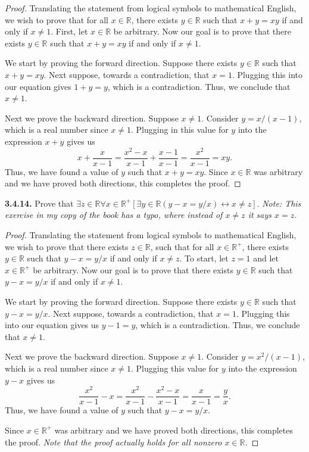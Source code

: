 \documentclass[12pt]{amsart}
\newenvironment{statement}[1]{\smallskip\noindent\color[rgb]{.6627, .3529, .6314} {\bf #1.}}{}
\theoremstyle{definition}
\theoremstyle{remark}
\newcommand{\BR}{\mathbb R}
\begin{document}
\begin{proof}
Translating the statement from logical symbols to mathematical English, we wish to prove that for all $x \in \BR$, there exists $y \in \BR$ such that $x + y = xy$ if and only if $x \neq 1$.
First, let $x \in \BR$ be arbitrary.
Now our goal is to prove that there exists $y \in \BR$ such that $x + y = xy$ if and only if $x \neq 1$.

We start by proving the forward direction.
Suppose there exists $y \in \BR$ such that $x + y = xy$. 
Next suppose, towards a contradiction, that $x = 1$.
Plugging this into our equation gives $1 + y = y$, which is a contradiction.
Thus, we conclude that $x \neq 1$.

Next we prove the backward direction.
Suppose $x \neq 1$.
Consider $y = x / (x - 1)$, which is a real number since $x \neq 1$.
Plugging in this value for $y$ into the expression $x + y$ gives us
\begin{equation*}
	x + \frac{x}{x - 1} = \frac{x^2 - x}{x - 1} + \frac{x - 1}{x - 1}
	= \frac{x^2}{x - 1} = xy.
\end{equation*}
Thus, we have found a value of $y$ such that $x + y = xy$.
Since $x \in \BR$ was arbitrary and we have proved both directions, this completes the proof.
\end{proof}


\begin{statement}{3.4.14}
Prove that $\exists z \in \BR \forall x \in \BR^+ [\exists y \in \BR (y - x = y / x) \leftrightarrow x \neq z]$.
\emph{Note: This exercise in my copy of the book has a typo, where instead of $x \neq z$ it says $x = z$.}
\end{statement}

\begin{proof}
Translating the statement from logical symbols to mathematical English, we wish to prove that there exists $z \in \BR$, such that for all $x \in \BR^+$, there exists $y \in \BR$ such that $y - x = y/x$ if and only if $x \neq z$.
To start, let $z = 1$ and let $x \in \BR^+$ be arbitrary.
Now our goal is to prove that there exists $y \in \BR$ such that $y - x = y / x$ if and only if $x \neq 1$.

We start by proving the forward direction.
Suppose there exists $y \in \BR$ such that $y - x = y / x$.
Next suppose, towards a contradiction, that $x = 1$.
Plugging this into our equation gives us $y - 1 = y$, which is a contradiction.
Thus, we conclude that $x \neq 1$.

Next we prove the backward direction.
Suppose $x \neq 1$.
Consider $y = x^2 / (x - 1)$, which is a real number since $x \neq 1$.
Plugging this value for $y$ into the expression $y - x$ gives us
\begin{equation*}
	\frac{x^2}{x - 1} - x = \frac{x^2}{x - 1} - \frac{x^2 - x}{x - 1}
	= \frac{x}{x - 1} = \frac{y}{x}.
\end{equation*}
Thus, we have found a value of $y$ such that $y - x = y / x$.

Since $x \in \BR^+$ was arbitrary and we have proved both directions, this completes the proof.
\emph{Note that the proof actually holds for all nonzero $x \in \BR$.}
\end{proof}
\end{document}

